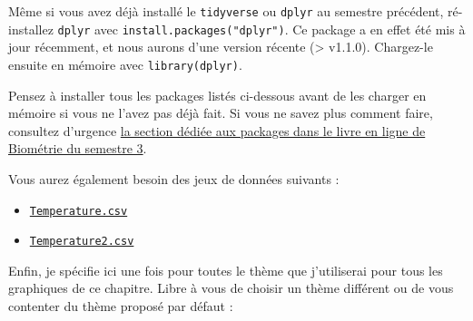\documentclass[
  french,
  a4paper,
  DIV=11,
  numbers=noendperiod,
  oneside]{scrreprt}
\providecommand{\tightlist}{%
  \setlength{\itemsep}{0pt}\setlength{\parskip}{0pt}}
\begin{document}
\begin{tcolorbox}[enhanced jigsaw, arc=.35mm, bottomrule=.15mm, bottomtitle=1mm, breakable, colback=white, colbacktitle=quarto-callout-warning-color!10!white, colframe=quarto-callout-warning-color-frame, coltitle=black, left=2mm, leftrule=.75mm, opacityback=0, opacitybacktitle=0.6, rightrule=.15mm, title=\textcolor{quarto-callout-warning-color}{\faExclamationTriangle}\hspace{0.5em}{Important}, titlerule=0mm, toprule=.15mm, toptitle=1mm]

Même si vous avez déjà installé le \texttt{tidyverse} ou \texttt{dplyr}
au semestre précédent, ré-installez \texttt{dplyr} avec
\texttt{install.packages("dplyr")}. Ce package a en effet été mis à jour
récemment, et nous aurons d'une version récente (\textgreater{} v1.1.0).
Chargez-le ensuite en mémoire avec \texttt{library(dplyr)}.

\end{tcolorbox}

\begin{tcolorbox}[enhanced jigsaw, arc=.35mm, bottomrule=.15mm, bottomtitle=1mm, breakable, colback=white, colbacktitle=quarto-callout-important-color!10!white, colframe=quarto-callout-important-color-frame, coltitle=black, left=2mm, leftrule=.75mm, opacityback=0, opacitybacktitle=0.6, rightrule=.15mm, title=\textcolor{quarto-callout-important-color}{\faExclamation}\hspace{0.5em}{Attention}, titlerule=0mm, toprule=.15mm, toptitle=1mm]

Pensez à installer tous les packages listés ci-dessous avant de les
charger en mémoire si vous ne l'avez pas déjà fait. Si vous ne savez
plus comment faire, consultez d'urgence
\href{https://besibo.github.io/BiometrieS3/01-R-basics.html\#sec-packages}{la
section dédiée aux packages dans le livre en ligne de Biométrie du
semestre 3}.

\end{tcolorbox}

Vous aurez également besoin des jeux de données suivants :

\begin{itemize}
\tightlist
\item
  \href{data/Temperature.csv}{\texttt{Temperature.csv}}
\item
  \href{data/Temperature2.csv}{\texttt{Temperature2.csv}}
\end{itemize}

Enfin, je spécifie ici une fois pour toutes le thème que j'utiliserai
pour tous les graphiques de ce chapitre. Libre à vous de choisir un
thème différent ou de vous contenter du thème proposé par défaut :
\end{document}
